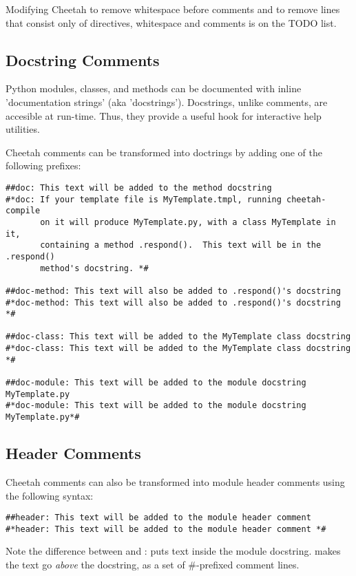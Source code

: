 Modifying Cheetah to remove whitespace before comments and to remove lines
that consist only of directives, whitespace and comments is on the TODO list.

\subsection{Docstring Comments}
\label{comments.docstring}

Python modules, classes, and methods can be documented with inline
'documentation strings' (aka 'docstrings').  Docstrings, unlike comments, are
accesible at run-time. Thus, they provide a useful hook for interactive help
utilities.  

Cheetah comments can be transformed into doctrings by adding one of the
following prefixes:

\begin{verbatim}
##doc: This text will be added to the method docstring
#*doc: If your template file is MyTemplate.tmpl, running cheetah-compile
       on it will produce MyTemplate.py, with a class MyTemplate in it,
       containing a method .respond().  This text will be in the .respond()
       method's docstring. *#

##doc-method: This text will also be added to .respond()'s docstring
#*doc-method: This text will also be added to .respond()'s docstring *#

##doc-class: This text will be added to the MyTemplate class docstring
#*doc-class: This text will be added to the MyTemplate class docstring *#

##doc-module: This text will be added to the module docstring MyTemplate.py
#*doc-module: This text will be added to the module docstring MyTemplate.py*#
\end{verbatim}

\subsection{Header Comments}
\label{comments.headers}
Cheetah comments can also be transformed into module header comments using the
following syntax:

\begin{verbatim}
##header: This text will be added to the module header comment
#*header: This text will be added to the module header comment *#
\end{verbatim}

Note the difference between  and :
 puts  text inside the module docstring.   makes the text go {\em above} the docstring, as a
set of \#-prefixed comment lines.

